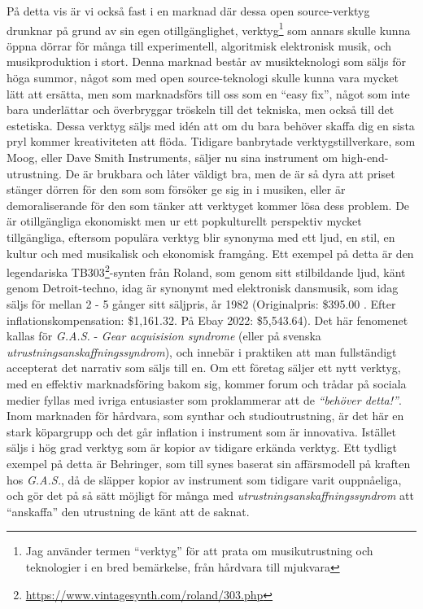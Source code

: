 \documentclass{article}
\begin{document}
På detta vis är vi också fast i en marknad där dessa open source-verktyg drunknar på grund av sin egen
otillgänglighet, verktyg\footnote{Jag använder termen ``verktyg'' för att prata om musikutrustning och
teknologier i en bred bemärkelse, från hårdvara till mjukvara} som annars skulle kunna öppna dörrar för många
till experimentell, algoritmisk elektronisk musik, och musikproduktion i stort. Denna marknad består av
musikteknologi som säljs för höga summor, något som med open source-teknologi skulle kunna vara mycket lätt
att ersätta, men som marknadsförs till oss som en ``easy fix'', något som inte bara underlättar och överbryggar
tröskeln till det tekniska, men också till det estetiska. Dessa verktyg säljs med idén att om du bara behöver
skaffa dig en sista pryl kommer kreativiteten att flöda. Tidigare banbrytade verktygstillverkare, som
Moog, eller Dave Smith Instruments, säljer nu sina instrument om high-end-utrustning. De är brukbara och låter
väldigt bra, men de är så dyra att priset stänger dörren för den som som försöker ge sig in i musiken, eller
är demoraliserande för den som tänker att verktyget kommer lösa dess problem. De är otillgängliga ekonomiskt
men ur ett popkulturellt perspektiv mycket tillgängliga, eftersom populära verktyg blir synonyma med ett ljud,
en stil, en kultur och med musikalisk och ekonomisk framgång. Ett exempel på detta är den legendariska
TB303\footnote{\url{https://www.vintagesynth.com/roland/303.php}}-synten från Roland, som genom sitt
stilbildande ljud, känt genom Detroit-techno, idag är synonymt med elektronisk dansmusik, som idag säljs för
mellan 2 - 5 gånger sitt säljpris, år 1982 (Originalpris: \$395.00 . Efter inflationskompensation: \$1,161.32.
På Ebay 2022: \$5,543.64). Det här fenomenet kallas för \emph{G.A.S.} - \emph{Gear acquisision syndrome}
(eller på svenska \emph{utrustningsanskaffningssyndrom}), och innebär i praktiken att man fullständigt
accepterat det narrativ som säljs till en. Om ett företag säljer ett nytt verktyg, med en effektiv
marknadsföring bakom sig, kommer forum och trådar på sociala medier fyllas med ivriga entusiaster som
proklammerar att de \emph{``behöver detta!''}. Inom marknaden för hårdvara, som synthar och studioutrustning,
är det här en stark köpargrupp och det går inflation i instrument som är innovativa. Istället säljs i hög grad
verktyg som är kopior av tidigare erkända verktyg. Ett tydligt exempel på detta är Behringer, som till synes
baserat sin affärsmodell på kraften hos \emph{G.A.S.}, då de släpper kopior av instrument som tidigare varit
ouppnåeliga, och gör det på så sätt möjligt för många med \emph{utrustningsanskaffningssyndrom} att
``anskaffa'' den utrustning de känt att de saknat.
\end{document}
